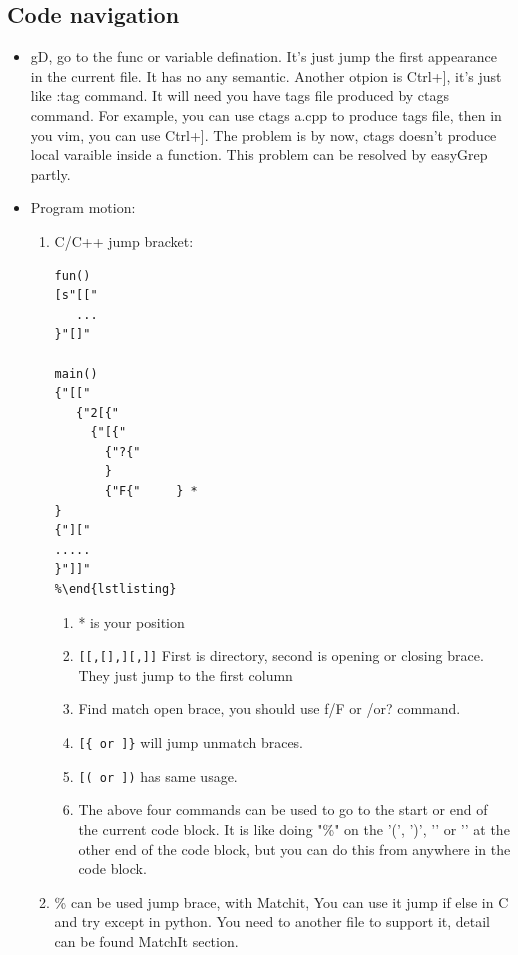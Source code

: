 \documentclass[a4paper,12pt,twoside]{book}
\begin{document}
\subsection{Code navigation}
\begin{itemize}
	\item gD, go to the func or variable defination. It's just jump the first appearance in the current file. It has no any semantic. Another otpion is Ctrl+], it's just like :tag command. It will need you have tags file produced by ctags command. For example, you can use ctags a.cpp to produce tags file, then in you vim, you can use Ctrl+]. The problem is by now, ctags doesn't produce local varaible inside a function.  This problem can be resolved by easyGrep partly.

	\item  Program motion:
\begin{enumerate}
 	\item C/C++ jump bracket:
\begin{verbatim}
fun()
[s"[["
   ...
}"[]"

main()
{"[["
   {"2[{"
	 {"[{" 
	   {"?{"
	   }
	   {"F{"     } *
}
{"]["
.....
}"]]"
%\end{lstlisting}
\end{verbatim}

\begin{enumerate}
		\item * is your position
		\item \verb=[[,[],][,]]= First is directory, second is opening or closing brace. They just jump to the first column
		\item Find match open brace, you should use f/F or /or? command. 
		\item \verb=[{ or ]}= will jump unmatch braces. 
		\item \verb=[( or ])= has same usage.

		\item The above four commands can be used to go to the start or end of the current code block.  It is like doing "\%" on the '(', ')', '{' or '}' at the other end of the code block, but you can do this from anywhere in the code block.
\end{enumerate}

\item \% can be used jump brace, with Matchit, You can use it jump if else in C and try except in python. You need to another file to support it, detail can be found MatchIt section. 


\end{enumerate}
\end{itemize}
\end{document}
